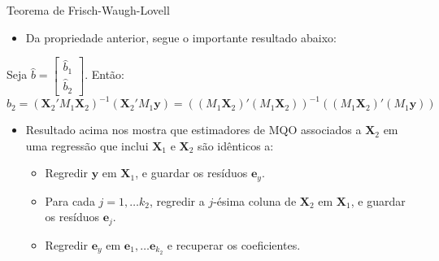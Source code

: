 \documentclass[11pt]{beamer}
\begin{document}
\begin{frame}{Teorema de Frisch-Waugh-Lovell}
\begin{itemize}
 	\item Da propriedade anterior, segue o importante resultado abaixo:
\end{itemize}
	\begin{theorem}
		Seja $\hat{b} = \begin{bmatrix}
			\hat{b}_1 \\
			\hat{b}_2
		\end{bmatrix}$. Então:
	$$\hat{b}_2 = \left(\boldsymbol{X}_2'M_1\boldsymbol{X}_2\right)^{-1}\left(\boldsymbol{X}_2'M_1\boldsymbol{y}\right) = \left((M_1\boldsymbol{X}_2)'(M_1\boldsymbol{X}_2)\right)^{-1}\left((M_1\boldsymbol{X}_2)'(M_1\boldsymbol{y})\right) $$ 
	\end{theorem}
\begin{itemize}
	\item Resultado acima nos mostra que estimadores de MQO associados a $\boldsymbol{X}_2$ em uma regressão que inclui $\boldsymbol{X}_1$ e $\boldsymbol{X}_2$ são idênticos a:
	\begin{itemize}
		\item Regredir $\boldsymbol{y}$ em $\boldsymbol{X}_1$, e guardar os resíduos $\boldsymbol{e}_y$.
		\item Para cada $j=1,\ldots k_2$, regredir a $j$-ésima coluna de $\boldsymbol{X}_2$ em $\boldsymbol{X}_1$, e guardar os resíduos ${\boldsymbol{e}_j}$.
		\item Regredir $\boldsymbol{e}_y$ em $\boldsymbol{e}_1,\ldots \boldsymbol{e}_{k_2}$ e recuperar os coeficientes.
	\end{itemize}
\end{itemize}
\end{frame}
\end{document}
